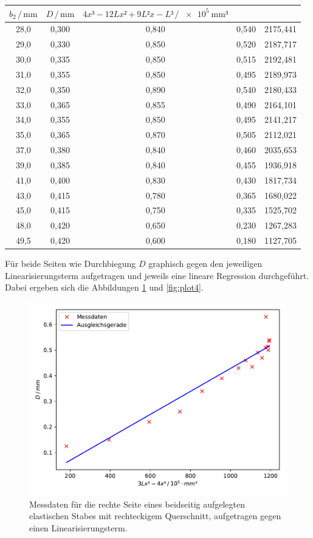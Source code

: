 \begin{table}
\begin{tabular}{c c c c c}
$b_2 \,/\, \si{\milli\meter}$ & $D \,/\, \si{\milli\meter}$ &
$4x³-12Lx²+9L²x-L³ \,/\, \SI{e5}{\milli\meter³}$\\
\midrule
28,0 & 0,300 & 0,840 & 0,540 & 2175,441\\
29,0 & 0,330 & 0,850 & 0,520 & 2187,717\\
30,0 & 0,335 & 0,850 & 0,515 & 2192,481\\
31,0 & 0,355 & 0,850 & 0,495 & 2189,973\\
32,0 & 0,350 & 0,890 & 0,540 & 2180,433\\
33,0 & 0,365 & 0,855 & 0,490 & 2164,101\\
34,0 & 0,355 & 0,850 & 0,495 & 2141,217\\
35,0 & 0,365 & 0,870 & 0,505 & 2112,021\\
37,0 & 0,380 & 0,840 & 0,460 & 2035,653\\
39,0 & 0,385 & 0,840 & 0,455 & 1936,918\\
41,0 & 0,400 & 0,830 & 0,430 & 1817,734\\
43,0 & 0,415 & 0,780 & 0,365 & 1680,022\\
45,0 & 0,415 & 0,750 & 0,335 & 1525,702\\
48,0 & 0,420 & 0,650 & 0,230 & 1267,283\\
49,5 & 0,420 & 0,600 & 0,180 & 1127,705\\
\bottomrule
\end{tabular}
\end{table}

Für beide Seiten wie Durchbiegung $D$ graphisch gegen den jeweiligen
Linearisierungsterm aufgetragen und jeweils eine lineare Regression
durchgeführt. Dabei ergeben sich die Abbildungen \ref{fig:plot3} und 
\ref{fig:plot4}. 

\begin{figure}
  \centering
  \includegraphics[scale=0.8]{content/plot3.pdf}
  \caption{Messdaten für die rechte Seite eines beidseitig aufgelegten elastischen Stabes mit 
  rechteckigem Querschnitt, aufgetragen gegen einen Linearisierungsterm.}
  \label{fig:plot3}
\end{figure}


